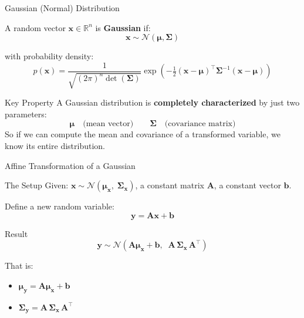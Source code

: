 \documentclass[aspectratio=169, 11pt]{beamer}
\newcommand{\T}{^{\top}}
\begin{document}
\begin{frame}{Gaussian (Normal) Distribution}

A random vector $\mathbf{x} \in \mathbb{R}^n$ is \textbf{Gaussian} if:
$$\mathbf{x} \sim \mathcal{N}(\bm{\mu}, \bm{\Sigma})$$

\vspace{-4pt}
with probability density:
$$p(\mathbf{x}) = \frac{1}{\sqrt{(2\pi)^n \det(\bm{\Sigma})}} \exp\!\left(-\tfrac{1}{2}(\mathbf{x}-\bm{\mu})\T \bm{\Sigma}^{-1}(\mathbf{x}-\bm{\mu})\right)$$

\vspace{8pt}

\begin{alertblock}{Key Property}
A Gaussian distribution is \textbf{completely characterized} by just two parameters:
$$\bm{\mu} \quad \text{(mean vector)} \qquad \bm{\Sigma} \quad \text{(covariance matrix)}$$
So if we can compute the mean and covariance of a transformed variable, we know its entire distribution.
\end{alertblock}

\end{frame}

\begin{frame}{Affine Transformation of a Gaussian}

\begin{block}{The Setup}
Given: $\mathbf{x} \sim \mathcal{N}(\bm{\mu}_{\mathbf{x}},\; \bm{\Sigma}_{\mathbf{x}})$, \quad
a constant matrix $\mathbf{A}$, \quad
a constant vector $\mathbf{b}$.

\vspace{6pt}
Define a new random variable:
$$\mathbf{y} = \mathbf{A}\mathbf{x} + \mathbf{b}$$
\end{block}

\vspace{6pt}

\begin{exampleblock}{Result}
$$\mathbf{y} \sim \mathcal{N}\!\left(\mathbf{A}\bm{\mu}_{\mathbf{x}} + \mathbf{b},\;\; \mathbf{A}\,\bm{\Sigma}_{\mathbf{x}}\,\mathbf{A}\T\right)$$
\end{exampleblock}

\vspace{6pt}

That is:
\begin{itemize}
  \item $\bm{\mu}_{\mathbf{y}} = \mathbf{A}\bm{\mu}_{\mathbf{x}} + \mathbf{b}$
  \item $\bm{\Sigma}_{\mathbf{y}} = \mathbf{A}\,\bm{\Sigma}_{\mathbf{x}}\,\mathbf{A}\T$
\end{itemize}

\end{frame}
\end{document}
